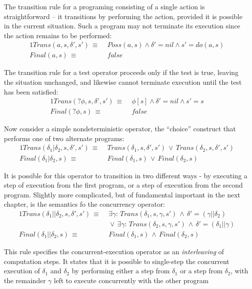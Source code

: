 The transition rule for a programing consisting of a single action
is straightforward -- it transitions by performing the action, provided
it is possible in the current situation. Such a program may not terminate
its execution since the action remains to be performed:\begin{alignat*}{1}
Trans(a,s,\delta',s')\,\equiv\, & \, Poss(a,s)\wedge\delta'=nil\wedge s'=do(a,s)\\
Final(a,s)\,\equiv\, & \, false\end{alignat*}


The transition rule for a test operator proceeds only if the test
is true, leaving the situation unchanged, and likewise cannot terminate
execution until the test has been satisfied:\begin{alignat*}{1}
Trans(?\phi,s,\delta',s')\,\equiv\, & \,\phi[s]\wedge\delta'=nil\wedge s'=s\\
Final(?\phi,s)\,\equiv\, & \, false\end{alignat*}


Now consider a simple nondeterministic operator, the {}``choice''
construct that performs one of two alternate programs:\begin{alignat*}{1}
Trans(\delta_{1}|\delta_{2},s,\delta',s')\,\equiv\, & \, Trans(\delta_{1},s,\delta',s')\,\vee\, Trans(\delta_{2},s,\delta',s')\\
Final(\delta_{1}|\delta_{2},s)\,\equiv\, & \, Final(\delta_{1},s)\,\vee\, Final(\delta_{2},s)\end{alignat*}


It is possible for this operator to transition in two different ways
- by executing a step of execution from the first program, or a step
of execution from the second program. Slightly more complicated, but
of fundamental important in the next chapter, is the semantics fo
the concurrency operator:\begin{alignat*}{1}
Trans(\delta_{1}||\delta_{2},s,\delta',s')\,\equiv\, & \,\exists\gamma:\, Trans(\delta_{1},s,\gamma,s')\,\wedge\,\delta'=(\gamma||\delta_{2})\\
 & \,\vee\,\exists\gamma:\, Trans(\delta_{2},s,\gamma,s')\,\wedge\,\delta'=(\delta_{1}||\gamma)\\
Final(\delta_{1}||\delta_{2},s)\,\equiv\, & \, Final(\delta_{1},s)\,\wedge\, Final(\delta_{2},s)\end{alignat*}


This rule specifies the concurrent-execution operator as an \emph{interleaving}
of computation steps. It states that it is possible to single-step
the concurrent execution of $\delta_{1}$ and $\delta_{2}$ by performing
either a step from $\delta_{1}$ or a step from $\delta_{2}$, with
the remainder $\gamma$ left to execute concurrently with the other
program

